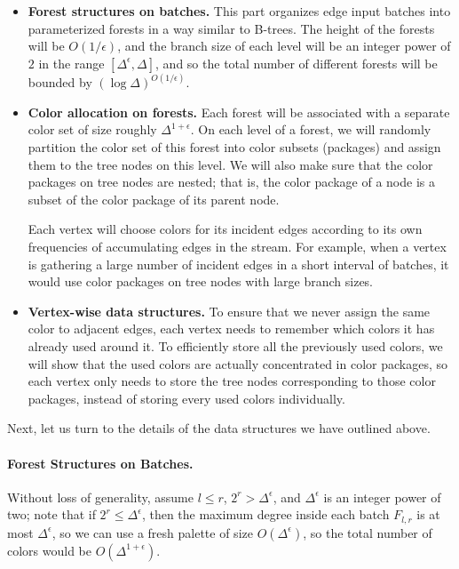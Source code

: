 \documentclass[11pt,a4paper]{article}
\newcommand{\eps}{\epsilon}
\begin{document}
\begin{itemize}
	\item \textbf{Forest structures on batches.} This part organizes edge input batches into parameterized forests in a way similar to B-trees. The height of the forests will be $O(1/\eps)$, and the branch size of each level will be an integer power of $2$ in the range $[\Delta^\eps, \Delta]$, and so the total number of different forests will be bounded by $(\log\Delta)^{O(1/\eps)}$. 
	
	\item \textbf{Color allocation on forests.} Each forest will be associated with a separate color set of size roughly $\Delta^{1+\eps}$. On each level of a forest, we will randomly partition the color set of this forest into color subsets (packages) and assign them to the tree nodes on this level. We will also make sure that the color packages on tree nodes are nested; that is, the color package of a node is a subset of the color package of its parent node.
	
	Each vertex will choose colors for its incident edges according to its own frequencies of accumulating edges in the stream. For example, when a vertex is gathering a large number of incident edges in a short interval of batches, it would use color packages on tree nodes with large branch sizes.
	
	\item \textbf{Vertex-wise data structures.} To ensure that we never assign the same color to adjacent edges, each vertex needs to remember which colors it has already used around it. To efficiently store all the previously used colors, we will show that the used colors are actually concentrated in color packages, so each vertex only needs to store the tree nodes corresponding to those color packages, instead of storing every used colors individually.
\end{itemize}

Next, let us turn to the details of the data structures we have outlined above.

\paragraph*{Forest Structures on Batches.} Without loss of generality, assume $l\leq r$, $2^r > \Delta^\epsilon$, and $\Delta^\epsilon$ is an integer power of two; note that if $2^r \leq \Delta^\epsilon$, then the maximum degree inside each batch $F_{l, r}$ is at most $\Delta^\epsilon$, so we can use a fresh palette of size $O(\Delta^\epsilon)$, so the total number of colors would be $O(\Delta^{1+\epsilon})$.
\end{document}

